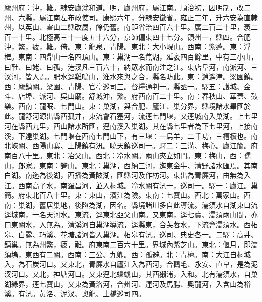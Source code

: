 \begin{pinyinscope}
廬州府：沖，難。隸安廬滁和道。明，廬州府，屬江南。順治初，因明制，改二州、六縣，屬江南左布政使司。康熙六年，分隸安徽省。雍正二年，升六安為直隸州，以英山、霍山二縣改屬，餘仍舊。南距省治四百六十里。廣二百二十里，袤二百一十里。北極高三十一度五十六分，京師偏東四十七分。領州一，縣四。合肥沖，繁，疲，難。倚。東：龍泉，青陽。東北：大小峴山。西南：紫蓬。東：浮槎。東南：四鼎山一名四頂山。東：巢湖一名焦湖，延袤四百餘里，中有三小山，曰鞋、曰姥、曰孤，港汊凡三百六十，納眾水而南注之江。東店阜河，南派河、三汊河，皆入焉。肥水逕雞鳴山，淮水來與之合，縣名昉此。東：逍遙津。梁園鎮。西：廬鎮關。梁園、青陽、官亭巡司三。督糧通判一。縣丞一。驛五：護城、金斗、店埠、派河、吳山廟。舒城沖，繁。府西南百二十里。南：春秋山、華蓋、鼓樂。西南：龍眠、七門山。東：巢湖，與合肥、廬江、巢分界，縣境諸水畢匯於此。龍舒河源出縣西孤井，東流會石塞河，流逕七門堰，又逕城南入巢湖。上七里河在縣西九里，西山諸水所匯，逕南溪入巢湖。其在縣七里者為下七里河，上接南溪，下達巢湖。七門堰在西南七門山下，有三堰：一烏羊，二千功，三槽櫝也。南北峽關、西陽山寨、上陽鎮有汛。曉天鎮巡司一。驛二：三溝、梅心。廬江簡。府南百八十里。東北：冶父山。西北：冷水關。兩山夾立如門。東：梅山，西：孺山，郎家。東南：礬山。東北：巢湖，西納三河，迤東金牛、清野諸水匯焉。其南白湖。南迤為後湖，西播為黃陂湖，匯縣河及作枋河。東出為青簾河，由無為入江。西南高子水，南羅昌河，並入桐城。冷水關有汛一，巡司一。驛一：廬江。巢簡。府東北百八十里。東：東山，濱江為險。東南：七寶山。西北：萬家山。西南：巢湖，舊居巢地，後陷為湖，因名。縣境諸川多自此導流。濡須水自湖東口流逕城南，一名天河水。東流，逕東北亞父山南。又東南，逕七寶、濡須兩山間，亦曰東關水，入無為。清溪河自巢湖導流，逕縣東，合芙蓉水，下流會濡須水。西柘皋、白露、巧溪、花塘諸河皆入巢湖。柘皋有汛。巡司、典史各一。二驛：高井、鎮巢。無為州繁，疲，難。府東南二百六十里。界城內紫芝山。東北：偃月，即濡須塢，東西有二關。西南：三公、九卿。西：孤避。北：青檀。南：大江自桐城入，為石炭河口。又東北，青簾水自廬江入為西河，合鵝毛、永安、直皁，是為泥汊河口。又北，神塘河口。又東逕北蟂蟣山，其西獺浦，入和。北有濡須水，自巢湖緣界，逕七寶山，又東為黃洛河，合州河、運河及馬腸、奧龍河，入含山為裕溪。有汛。黃洛、泥汊、奧龍、土橋巡司四。


\end{pinyinscope}
